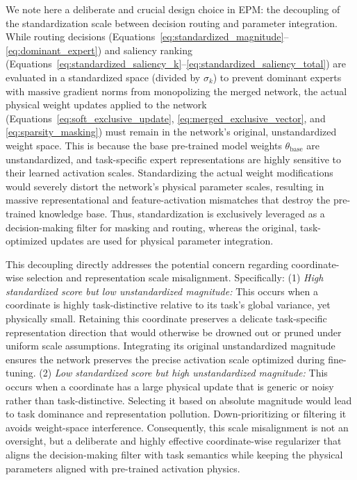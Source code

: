 We note here a deliberate and crucial design choice in EPM: the decoupling of the standardization scale between decision routing and parameter integration. While routing decisions (Equations~\ref{eq:standardized_magnitude}--\ref{eq:dominant_expert}) and saliency ranking (Equations~\ref{eq:standardized_saliency_k}--\ref{eq:standardized_saliency_total}) are evaluated in a standardized space (divided by $\sigma_k$) to prevent dominant experts with massive gradient norms from monopolizing the merged network, the actual physical weight updates applied to the network (Equations~\ref{eq:soft_exclusive_update}, \ref{eq:merged_exclusive_vector}, and \ref{eq:sparsity_masking}) must remain in the network's original, unstandardized weight space. This is because the base pre-trained model weights $\theta_{\text{base}}$ are unstandardized, and task-specific expert representations are highly sensitive to their learned activation scales. Standardizing the actual weight modifications would severely distort the network's physical parameter scales, resulting in massive representational and feature-activation mismatches that destroy the pre-trained knowledge base. Thus, standardization is exclusively leveraged as a decision-making filter for masking and routing, whereas the original, task-optimized updates are used for physical parameter integration.

This decoupling directly addresses the potential concern regarding coordinate-wise selection and representation scale misalignment. Specifically:
(1) \emph{High standardized score but low unstandardized magnitude:} This occurs when a coordinate is highly task-distinctive relative to its task's global variance, yet physically small. Retaining this coordinate preserves a delicate task-specific representation direction that would otherwise be drowned out or pruned under uniform scale assumptions. Integrating its original unstandardized magnitude ensures the network preserves the precise activation scale optimized during fine-tuning.
(2) \emph{Low standardized score but high unstandardized magnitude:} This occurs when a coordinate has a large physical update that is generic or noisy rather than task-distinctive. Selecting it based on absolute magnitude would lead to task dominance and representation pollution. Down-prioritizing or filtering it avoids weight-space interference.
Consequently, this scale misalignment is not an oversight, but a deliberate and highly effective coordinate-wise regularizer that aligns the decision-making filter with task semantics while keeping the physical parameters aligned with pre-trained activation physics.

